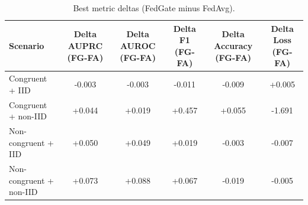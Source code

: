 \begin{table}[t]
\centering
\caption{Best metric deltas (FedGate minus FedAvg).}
\label{tab:paper_delta_best}
\begin{tabular}{lccccc}
\toprule
Scenario & Delta AUPRC (FG-FA) & Delta AUROC (FG-FA) & Delta F1 (FG-FA) & Delta Accuracy (FG-FA) & Delta Loss (FG-FA) \\
\midrule
Congruent + IID & -0.003 & -0.003 & -0.011 & -0.009 & +0.005 \\
Congruent + non-IID & +0.044 & +0.019 & +0.457 & +0.055 & -1.691 \\
Non-congruent + IID & +0.050 & +0.049 & +0.019 & -0.003 & -0.007 \\
Non-congruent + non-IID & +0.073 & +0.088 & +0.067 & -0.019 & -0.005 \\
\bottomrule
\end{tabular}
\end{table}
